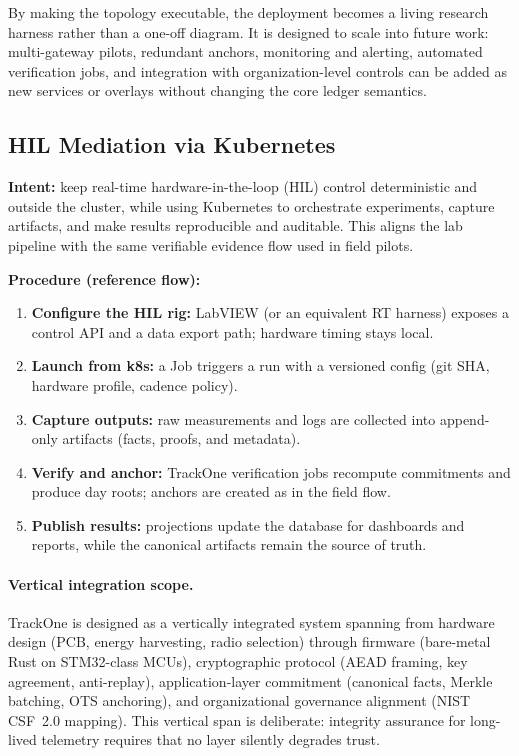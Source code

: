 By making the topology executable, the deployment becomes a living research harness rather than a one-off diagram.
It is designed to scale into future work: multi-gateway pilots, redundant anchors, monitoring and alerting, automated verification jobs, and integration with organization-level controls can be added as new services or overlays without changing the core ledger semantics.

\subsection{HIL Mediation via Kubernetes}\label{subsec:hil-mediation-via-kubernetes}
\textbf{Intent:} keep real-time hardware-in-the-loop (HIL) control deterministic and outside the cluster, while using Kubernetes to orchestrate experiments, capture artifacts, and make results reproducible and auditable.
This aligns the lab pipeline with the same verifiable evidence flow used in field pilots.

\textbf{Procedure (reference flow):}
\begin{enumerate}[nosep]
  \item \textbf{Configure the HIL rig:} LabVIEW (or an equivalent RT harness) exposes a control \ac{API} and a data export path; hardware timing stays local.
  \item \textbf{Launch from k8s:} a Job triggers a run with a versioned config (git \ac{SHA}, hardware profile, cadence policy).
  \item \textbf{Capture outputs:} raw measurements and logs are collected into append-only artifacts (facts, proofs, and metadata).
  \item \textbf{Verify and anchor:} TrackOne verification jobs recompute commitments and produce day roots; anchors are created as in the field flow.
  \item \textbf{Publish results:} projections update the database for dashboards and reports, while the canonical artifacts remain the source of truth.
\end{enumerate}

\paragraph{Vertical integration scope.}
TrackOne is designed as a vertically integrated system spanning from
hardware design (PCB, energy harvesting, radio selection) through
firmware (bare-metal Rust on STM32-class \ac{MCU}s), cryptographic protocol
(\ac{AEAD} framing, key agreement, anti-replay), application-layer commitment
(canonical facts, Merkle batching, \ac{OTS} anchoring), and organizational
governance alignment (\ac{NIST} C\ac{SF}~2.0 mapping).
This vertical span is
deliberate: integrity assurance for long-lived telemetry requires that
no layer silently degrades trust.

